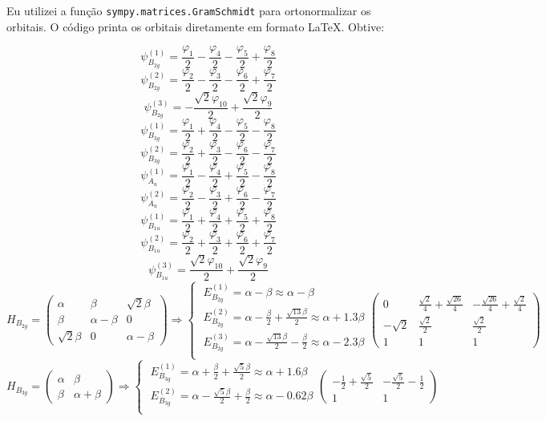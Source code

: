 \documentclass[a4paper,10pt]{article}
\newcommand{\python}[1]{\texttt{#1}}
\begin{document}
Eu utilizei a função \python{sympy.matrices.GramSchmidt} para ortonormalizar os orbitais. O código printa os orbitais diretamente em formato \LaTeX. Obtive:

$$
\psi_{B_{2g}}^{(1)} = \frac{\varphi_{1}}{2} - \frac{\varphi_{4}}{2} - \frac{\varphi_{5}}{2} + \frac{\varphi_{8}}{2}
$$
$$
\psi_{B_{2g}}^{(2)} = \frac{\varphi_{2}}{2} - \frac{\varphi_{3}}{2} - \frac{\varphi_{6}}{2} + \frac{\varphi_{7}}{2}
$$
$$
\psi_{B_{2g}}^{(3)} = - \frac{\sqrt{2} \varphi_{10}}{2} + \frac{\sqrt{2} \varphi_{9}}{2}
$$
$$
\psi_{B_{3g}}^{(1)} = \frac{\varphi_{1}}{2} + \frac{\varphi_{4}}{2} - \frac{\varphi_{5}}{2} - \frac{\varphi_{8}}{2}
$$
$$
\psi_{B_{3g}}^{(2)} = \frac{\varphi_{2}}{2} + \frac{\varphi_{3}}{2} - \frac{\varphi_{6}}{2} - \frac{\varphi_{7}}{2}
$$
$$
\psi_{A_{u}}^{(1)} = \frac{\varphi_{1}}{2} - \frac{\varphi_{4}}{2} + \frac{\varphi_{5}}{2} - \frac{\varphi_{8}}{2}
$$
$$
\psi_{A_{u}}^{(2)} = \frac{\varphi_{2}}{2} - \frac{\varphi_{3}}{2} + \frac{\varphi_{6}}{2} - \frac{\varphi_{7}}{2}
$$
$$
\psi_{B_{1u}}^{(1)} = \frac{\varphi_{1}}{2} + \frac{\varphi_{4}}{2} + \frac{\varphi_{5}}{2} + \frac{\varphi_{8}}{2}
$$
$$
\psi_{B_{1u}}^{(2)} = \frac{\varphi_{2}}{2} + \frac{\varphi_{3}}{2} + \frac{\varphi_{6}}{2} + \frac{\varphi_{7}}{2}
$$
$$
\psi_{B_{1u}}^{(3)} = \frac{\sqrt{2} \varphi_{10}}{2} + \frac{\sqrt{2} \varphi_{9}}{2}
$$
$$
H_{B_{2g}} = \begin{pmatrix}\alpha & \beta & \sqrt{2} \beta\\\beta & \alpha - \beta & 0\\\sqrt{2} \beta & 0 & \alpha - \beta\end{pmatrix}
\Rightarrow\begin{cases}\; E_{B_{2g}}^{(1)} = \alpha - \beta \approx \alpha - \beta \\\; E_{B_{2g}}^{(2)} = \alpha - \frac{\beta}{2} + \frac{\sqrt{13} \beta}{2} \approx \alpha + 1.3 \beta \\\; E_{B_{2g}}^{(3)} = \alpha - \frac{\sqrt{13} \beta}{2} - \frac{\beta}{2} \approx \alpha - 2.3 \beta \\\end{cases}\begin{pmatrix}0 & \frac{\sqrt{2}}{4} + \frac{\sqrt{26}}{4} & - \frac{\sqrt{26}}{4} + \frac{\sqrt{2}}{4}\\- \sqrt{2} & \frac{\sqrt{2}}{2} & \frac{\sqrt{2}}{2}\\1 & 1 & 1\end{pmatrix}
$$
$$
H_{B_{3g}} = \begin{pmatrix}\alpha & \beta\\\beta & \alpha + \beta\end{pmatrix}
\Rightarrow\begin{cases}\; E_{B_{3g}}^{(1)} = \alpha + \frac{\beta}{2} + \frac{\sqrt{5} \beta}{2} \approx \alpha + 1.6 \beta \\\; E_{B_{3g}}^{(2)} = \alpha - \frac{\sqrt{5} \beta}{2} + \frac{\beta}{2} \approx \alpha - 0.62 \beta \\\end{cases}\begin{pmatrix}- \frac{1}{2} + \frac{\sqrt{5}}{2} & - \frac{\sqrt{5}}{2} - \frac{1}{2}\\1 & 1\end{pmatrix}
$$
\end{document}
